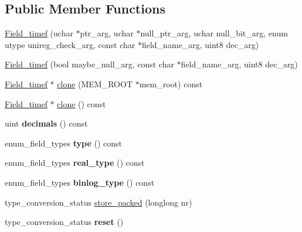 \subsection*{Public Member Functions}
\begin{DoxyCompactItemize}
\item 
\mbox{\hyperlink{classField__timef_a4d61c246c27021f3d76a48267b180d0c}{Field\+\_\+timef}} (uchar $\ast$ptr\+\_\+arg, uchar $\ast$null\+\_\+ptr\+\_\+arg, uchar null\+\_\+bit\+\_\+arg, enum utype unireg\+\_\+check\+\_\+arg, const char $\ast$field\+\_\+name\+\_\+arg, uint8 dec\+\_\+arg)
\item 
\mbox{\hyperlink{classField__timef_a8788165732571277b805ca2e29828ac0}{Field\+\_\+timef}} (bool maybe\+\_\+null\+\_\+arg, const char $\ast$field\+\_\+name\+\_\+arg, uint8 dec\+\_\+arg)
\item 
\mbox{\hyperlink{classField__timef}{Field\+\_\+timef}} $\ast$ \mbox{\hyperlink{classField__timef_af4e77673fa7a018ffa0c31ce8b85b243}{clone}} (M\+E\+M\+\_\+\+R\+O\+OT $\ast$mem\+\_\+root) const
\item 
\mbox{\hyperlink{classField__timef}{Field\+\_\+timef}} $\ast$ \mbox{\hyperlink{classField__timef_a88b9adbc0663936c630f04f5567fae06}{clone}} () const
\item 
\mbox{\label{classField__timef_a838f9f4266c125c881e2f6f6057ea331}} 
uint {\bfseries decimals} () const
\item 
\mbox{\label{classField__timef_a44c2b4a59c1154819c4dc05a93c3053b}} 
enum\+\_\+field\+\_\+types {\bfseries type} () const
\item 
\mbox{\label{classField__timef_a68308c071b18f494845db487483f312e}} 
enum\+\_\+field\+\_\+types {\bfseries real\+\_\+type} () const
\item 
\mbox{\label{classField__timef_a76a63c6975971de4d55d9915e5a841fb}} 
enum\+\_\+field\+\_\+types {\bfseries binlog\+\_\+type} () const
\item 
type\+\_\+conversion\+\_\+status \mbox{\hyperlink{classField__timef_a02f430536cb0135e28b813aed91579d2}{store\+\_\+packed}} (longlong nr)
\item 
\mbox{\label{classField__timef_a3abc3af462397768b36d7eb010333825}} 
type\+\_\+conversion\+\_\+status {\bfseries reset} ()

\end{DoxyCompactItemize}
